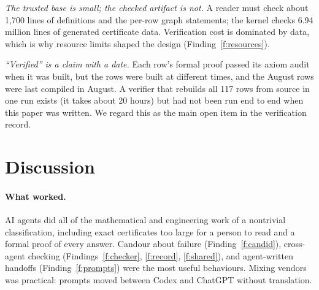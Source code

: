 \documentclass[11pt,a4paper]{article}
\begin{document}
\emph{The trusted base is small; the checked artifact is not.} A reader must check about 1,700 lines of
definitions and the per-row graph statements; the kernel checks 6.94 million lines of generated certificate data.
Verification cost is dominated by data, which is why resource limits shaped the design
(Finding~\ref{f:resources}).

\emph{``Verified'' is a claim with a date.} Each row's formal proof passed its axiom audit when it was built,
but the rows were built at different times, and the August rows were last compiled in August. A verifier that
rebuilds all 117 rows from source in one run exists (it takes about 20 hours) but had not been run end to end
when this paper was written. We regard this as the main open item in the verification record.

\section{Discussion}\label{sec:discussion}

\paragraph{What worked.} AI agents did all of the mathematical and engineering work of a nontrivial
classification, including exact certificates too large for a person to read and a formal proof of every
answer. Candour about failure (Finding~\ref{f:candid}), cross-agent checking (Findings~\ref{f:checker},
\ref{f:record}, \ref{f:shared}), and agent-written handoffs (Finding~\ref{f:prompts}) were the most useful
behaviours. Mixing vendors was practical: prompts moved between Codex and ChatGPT without translation.
\end{document}
